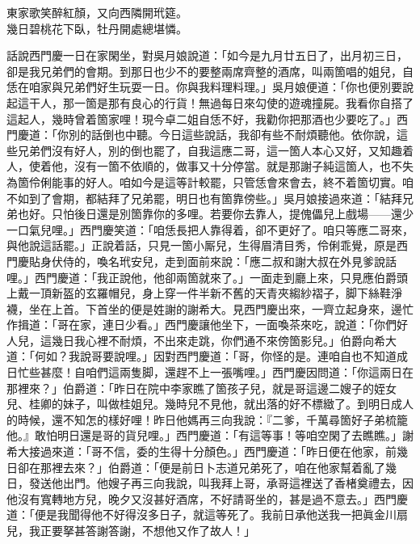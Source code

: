 \begin{myquote}
東家歌笑醉紅顏，又向西隣開玳筵。\\
幾日碧桃花下臥，牡丹開處總堪憐。
\end{myquote}

話說西門慶一日在家閑坐，對吳月娘說道：「如今是九月廿五日了，出月初三日，卻是我兄弟們的會期。到那日也少不的要整兩席齊整的酒席，叫兩箇唱的姐兒，自恁在咱家與兄弟們好生玩耍一日。你與我料理料理。」吳月娘便道：「你也便別要說起這干人，那一箇是那有良心的行貨！無過每日來勾使的遊魂撞屍。我看你自搭了這起人，幾時曾着箇家哩！{}現今卓二姐自恁不好，我勸你把那酒也少要吃了。」西門慶道：「你別的話倒也中聽。今日這些說話，我卻有些不耐煩聽他。依你說，這些兄弟們沒有好人，別的倒也罷了，自我這應二哥，這一箇人本心又好，又知趣着人，{}使着他，沒有一箇不依順的，做事又十分停當。就是那謝子純這箇人，也不失為箇伶俐能事的好人。咱如今是這等計較罷，只管恁會來會去，終不着箇切實。咱不如到了會期，都結拜了兄弟罷，明日也有箇靠傍些。」吳月娘接過來道：「結拜兄弟也好。只怕後日還是別箇靠你的多哩。若要你去靠人，提傀儡兒上戲場——還少一口氣兒哩。」西門慶笑道：「咱恁長把人靠得着，卻不更好了。咱只等應二哥來，與他說這話罷。」正說着話，只見一箇小厮兒，生得眉清目秀，伶俐乖覺，原是西門慶貼身伏侍的，喚名玳安兒，走到面前來說：「應二叔和謝大叔在外見爹說話哩。」西門慶道：「我正說他，他卻兩箇就來了。」一面走到廳上來，只見應伯爵頭上戴一頂新盔的玄羅帽兒，身上穿一件半新不舊的天青夾縐紗褶子，脚下絲鞋淨襪，坐在上首。下首坐的便是姓謝的謝希大。見西門慶出來，一齊立起身來，邊忙作揖道：「哥在家，連日少看。」西門慶讓他坐下，一面喚茶來吃，說道：「你們好人兒，這幾日我心裡不耐煩，不出來走跳，你們通不來傍箇影兒。」伯爵向希大道：「何如？我說哥要說哩。」因對西門慶道：「哥，你怪的是。連咱自也不知道成日忙些甚麼！自咱們這兩隻脚，還趕不上一張嘴哩。」西門慶因問道：「你這兩日在那裡來？」伯爵道：「昨日在院中李家瞧了箇孩子兒，就是哥這邊二嫂子的姪女兒、桂卿的妹子，叫做桂姐兒。幾時兒不見他，就出落的好不標緻了。到明日成人的時候，還不知怎的樣好哩！昨日他媽再三向我說：『二爹，千萬尋箇好子弟梳籠他。』敢怕明日還是哥的貨兒哩。」{}西門慶道：「有這等事！等咱空閑了去瞧瞧。」謝希大接過來道：「哥不信，委的生得十分顏色。」西門慶道：「昨日便在他家，前幾日卻在那裡去來？」伯爵道：「便是前日卜志道兄弟死了，咱在他家幫着亂了幾日，發送他出門。{}他嫂子再三向我說，叫我拜上哥，承哥這裡送了香楮奠禮去，因他沒有寬轉地方兒，晚夕又沒甚好酒席，不好請哥坐的，甚是過不意去。」西門慶道：「便是我聞得他不好得沒多日子，就這等死了。我前日承他送我一把眞金川扇兒，我正要拏甚答謝答謝，不想他又作了故人！」

